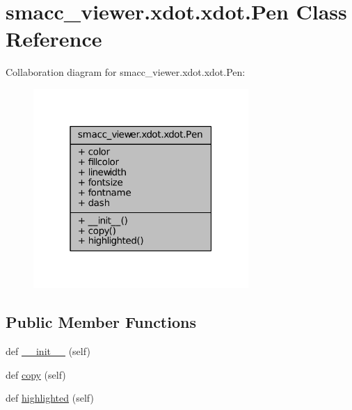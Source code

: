 \hypertarget{classsmacc__viewer_1_1xdot_1_1xdot_1_1Pen}{}\section{smacc\+\_\+viewer.\+xdot.\+xdot.\+Pen Class Reference}
\label{classsmacc__viewer_1_1xdot_1_1xdot_1_1Pen}


Collaboration diagram for smacc\+\_\+viewer.\+xdot.\+xdot.\+Pen\+:
\nopagebreak
\begin{figure}[H]
\begin{center}
\leavevmode
\includegraphics[width=232pt]{classsmacc__viewer_1_1xdot_1_1xdot_1_1Pen__coll__graph}
\end{center}
\end{figure}
\subsection*{Public Member Functions}
\begin{DoxyCompactItemize}
\item 
def \hyperlink{classsmacc__viewer_1_1xdot_1_1xdot_1_1Pen_a6b4341f63a8f1afe8b5c5e05da850bcb}{\+\_\+\+\_\+init\+\_\+\+\_\+} (self)
\item 
def \hyperlink{classsmacc__viewer_1_1xdot_1_1xdot_1_1Pen_a8d65349131e97ab0836ded1e120bec8a}{copy} (self)
\item 
def \hyperlink{classsmacc__viewer_1_1xdot_1_1xdot_1_1Pen_a74643889bdfc082589512aebf1e3818e}{highlighted} (self)
\end{DoxyCompactItemize}

